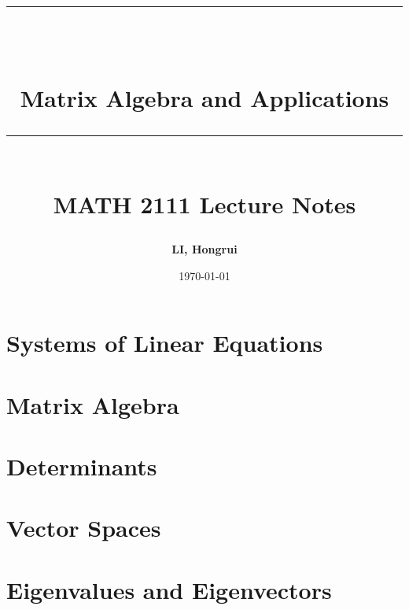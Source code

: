 \documentclass[10pt, a4paper]{article}
\newcommand{\HRule}[1]{\rule{\linewidth}{#1}}
\begin{document}
\title{ \normalsize \textsc{}
\\ [2.0cm]
\HRule{1.5pt} \\ [0.3cm]
\LARGE {\textbf{Matrix Algebra and Applications}
\HRule{1.5pt} \\ [0.6cm]
\LARGE{\textbf{MATH 2111 Lecture Notes}} \vspace*{10\baselineskip}}
}
\date{\today}
\author{\textbf{LI, Hongrui}}  %
\maketitle

\clearpage
\tableofcontents
\newpage


\section{Systems of Linear Equations}
\section{Matrix Algebra}
\section{Determinants}
\section{Vector Spaces}
\newpage



\section{Eigenvalues and Eigenvectors}
\end{document}
